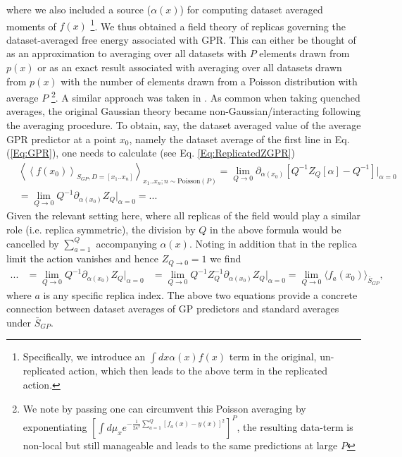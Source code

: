 where we also included a source ($\alpha(x)$) for computing dataset averaged moments of $f(x)$ \footnote{Specifically, we introduce an $\int dx \alpha(x) f(x)$ term in the original, un-replicated action, which then leads to the above term in the replicated action.}.  We thus obtained a field theory of replicas governing the dataset-averaged free energy associated with GPR. This can either be thought of as an approximation to averaging over all datasets with $P$ elements drawn from $p(x)$ or as an exact result associated with averaging over all datasets drawn from $p(x)$ with the number of elements drawn from a Poisson distribution with average $P$ \footnote{We note by passing one can circumvent this Poisson averaging by exponentiating $[\int d\mu_x e^{-\frac{1}{2\kappa^2}\sum_{a=1}^Q [f_a(x)-y(x)]^2}]^P$, the resulting data-term is non-local but still manageable and leads to the same predictions at large $P$}. A similar approach was taken in \cite{malzahn2001variational,cohen2021learning}.  As common when taking quenched averages, the original Gaussian theory became non-Gaussian/interacting following the averaging procedure. To obtain, say, the dataset averaged value of the average GPR predictor at a point $x_0$, namely the dataset average of the first line in Eq. (\ref{Eq:GPR}), one needs to calculate (see Eq. \ref{Eq:ReplicatedZGPR}) 
\begin{align}
&\left\langle \left \langle f(x_0) \right \rangle_{S_{GP},D=[x_1..x_n]}  \right\rangle_{x_1..x_n;n\sim \text{Poisson}(P)} = \lim_{Q\rightarrow 0}\partial_{\alpha(x_0)} \left[Q^{-1}Z_Q[\alpha]-Q^{-1} \right]|_{\alpha=0} \\ \nonumber 
&= \lim_{Q\rightarrow 0} Q^{-1} \partial_{\alpha(x_0)}Z_Q|_{\alpha=0} = ...
\end{align}
Given the relevant setting here, where all replicas of the field would play a similar role (i.e. replica symmetric), the division by $Q$ in the above formula would be cancelled by $\sum_{a=1}^Q$ accompanying $\alpha(x)$. Noting in addition that in the replica limit the action vanishes and hence $Z_{Q\rightarrow 0}=1$ we find 
\begin{align}
... &= \lim_{Q\rightarrow 0} Q^{-1} \partial_{\alpha(x_0)}Z_Q|_{\alpha=0} &= \lim_{Q\rightarrow 0} Q^{-1} Z^{-1}_Q\partial_{\alpha(x_0)}Z_Q|_{\alpha=0} = \lim_{Q\rightarrow 0}\langle f_{a}(x_0) \rangle_{\bar{S}_{GP}},
\end{align}
where $a$ is any specific replica index. 
The above two equations provide a concrete connection between dataset averages of GP predictors and standard averages under $\bar{S}_{GP}$. 

